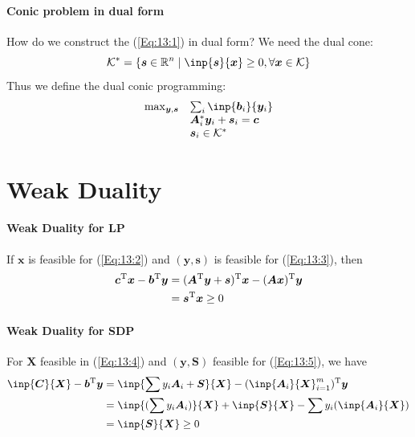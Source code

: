 \paragraph{Conic problem in dual form} How do we construct the (\ref{Eq:13:1}) in dual form? We need the dual cone:
\[
\mathcal{K}^*=\{\bm s\in\mathbb{R}^n\mid\inp{\bm s}{\bm x}\ge0,\forall\bm x\in\mathcal{K}\}
\]
Thus we define the dual conic programming:
\begin{equation}\label{Eq:13:9}
\begin{array}{ll}
\max_{\bm y,\bm s}&\sum_i\inp{\bm b_i}{\bm y_i}\\
&\bm A_i^*\bm y_i+\bm s_i=\bm c\\
&\bm s_i\in\mathcal{K}^*
\end{array}
\end{equation}



\section{Weak Duality}
\paragraph{Weak Duality for LP}
If $\bm x$ is feasible for (\ref{Eq:13:2}) and $(\bm y,\bm s)$ is feasible for (\ref{Eq:13:3}), then
\begin{align*}
\bm c^{\mathrm T}\bm x-\bm b^{\mathrm T}\bm y&=(\bm A^{\mathrm T}\bm y+\bm s)^{\mathrm T}\bm x-(\bm A\bm x)^{\mathrm T}\bm y\\
&=\bm s^{\mathrm T}\bm x\ge0
\end{align*}
\paragraph{Weak Duality for SDP}
For $\bm X$ feasible in (\ref{Eq:13:4}) and $(\bm y,\bm S)$ feasible for (\ref{Eq:13:5}), we have
\begin{align*}
\inp{\bm C}{\bm X}-\bm b\trans\bm y&=\inp{\sum y_i\bm A_i+\bm S}{\bm X}-(\inp{\bm A_i}{\bm X}_{i=1}^m)\trans\bm y\\
&=\inp{(\sum y_i\bm A_i)}{\bm X}+\inp{\bm S}{\bm X}-\sum y_i(\inp{\bm A_i}{\bm X})\\
&=\inp{\bm S}{\bm X}\ge0
\end{align*}
